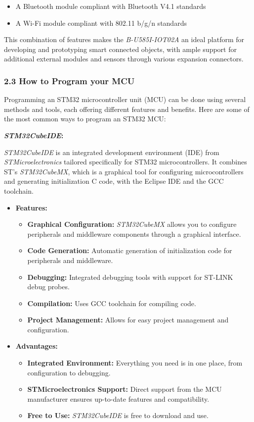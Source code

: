 \documentclass[10pt,a4paper,onecolumn]{article}
\begin{document}
\begin{itemize}
  \item A Bluetooth module compliant with Bluetooth V4.1 standards
  \item A Wi-Fi module compliant with 802.11 b/g/n standards
\end{itemize}

This combination of features makes the \textit{B-U585I-IOT02A} an ideal platform for developing and prototyping smart connected objects, with ample support for additional external modules and sensors through various expansion connectors.

\hypertarget{how-to-program-your-mcu}{%
\subsubsection{2.3 How to Program your
MCU}\label{how-to-program-your-mcu}}

Programming an STM32 microcontroller unit (MCU) can be done using several methods and tools, each offering different features and benefits. Here are some of the most common ways to program an STM32 MCU:

\textbf{\textit{STM32CubeIDE}:}

\textit{STM32CubeIDE} is an integrated development environment (IDE) from \textit{STMicroelectronics} tailored specifically for STM32 microcontrollers. It combines ST’s \textit{STM32CubeMX}, which is a graphical tool for configuring microcontrollers and generating initialization C code, with the Eclipse IDE and the GCC toolchain.

\begin{itemize}
  \item \textbf{Features:}
    \begin{itemize}
      \item \textbf{Graphical Configuration:} \textit{STM32CubeMX} allows you to configure peripherals and middleware components through a graphical interface.
      \item \textbf{Code Generation:} Automatic generation of initialization code for peripherals and middleware.
      \item \textbf{Debugging:} Integrated debugging tools with support for ST-LINK debug probes.
      \item \textbf{Compilation:} Uses GCC toolchain for compiling code.
      \item \textbf{Project Management:} Allows for easy project management and configuration.
    \end{itemize}
  \item \textbf{Advantages:}
    \begin{itemize}
      \item \textbf{Integrated Environment:} Everything you need is in one place, from configuration to debugging.
      \item \textbf{STMicroelectronics Support:} Direct support from the MCU manufacturer ensures up-to-date features and compatibility.
      \item \textbf{Free to Use:} \textit{STM32CubeIDE} is free to download and use.
    \end{itemize}
\end{itemize}
\end{document}
